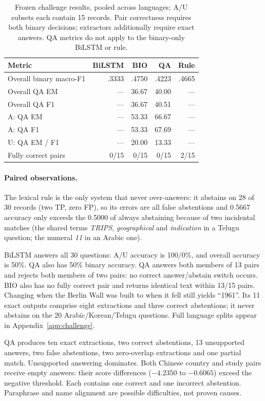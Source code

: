 \documentclass[11pt]{article}
\begin{document}
\begin{table}[t]
\centering\small\setlength{\tabcolsep}{4pt}
\begin{tabular}{lrrrr}
\toprule
Metric & BiLSTM & BIO & QA & Rule\\
\midrule
Overall binary macro-F1 & .3333 & .4750 & .4223 & .4665\\
Overall QA EM & --- & 36.67 & 40.00 & ---\\
Overall QA F1 & --- & 36.67 & 40.51 & ---\\
A: QA EM & --- & 53.33 & 66.67 & ---\\
A: QA F1 & --- & 53.33 & 67.69 & ---\\
U: QA EM / F1 & --- & 20.00 & 13.33 & ---\\
Fully correct pairs & 0/15 & 0/15 & 0/15 & 2/15\\
\bottomrule
\end{tabular}
\caption{Frozen challenge results, pooled across languages; A/U subsets each contain 15 records. Pair correctness requires both binary decisions; extractors additionally require exact answers. QA metrics do not apply to the binary-only BiLSTM or rule.}
\label{tab:challenge}
\end{table}

\paragraph{Paired observations.}
The lexical rule is the only system that never over-answers: it abstains on 28 of 30 records (two TP, zero FP), so its errors are all false abstentions and 0.5667 accuracy only exceeds the 0.5000 of always abstaining because of two incidental matches (the shared terms \emph{TRIPS}, \emph{geographical} and \emph{indication} in a Telugu question; the numeral \emph{11} in an Arabic one).

BiLSTM answers all 30 questions: A/U accuracy is 100/0\%, and overall accuracy is 50\%. QA also has 50\% binary accuracy. QA answers both members of 13 pairs and rejects both members of two pairs: no correct answer/abstain switch occurs. BIO also has no fully correct pair and returns identical text within 13/15 pairs. Changing when the Berlin Wall was built to when it fell still yields ``1961''. Its 11 exact outputs comprise eight extractions and three correct abstentions; it never abstains on the 20 Arabic/Korean/Telugu questions. Full language splits appear in Appendix~\ref{app:challenge}.

QA produces ten exact extractions, two correct abstentions, 13 unsupported answers, two false abstentions, two zero-overlap extractions and one partial match. Unsupported answering dominates. Both Chinese country and study pairs receive empty answers: their score differences ($-4.2350$ to $-0.6065$) exceed the negative threshold. Each contains one correct and one incorrect abstention. Paraphrase and name alignment are possible difficulties, not proven causes.
\end{document}
